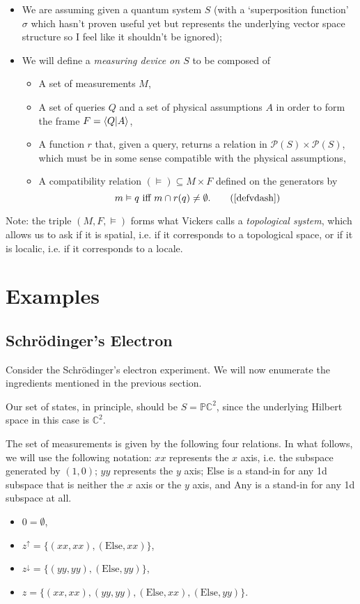 \documentclass{article}
\theoremstyle{definition}
\theoremstyle{plain}
\newcommand{\C}{\mathbb{C}}
\newcommand{\ps}{\mathcal{P}}
\newcommand{\pr}{\mathbb{P}}
\begin{document}
\begin{itemize}
\item We are assuming given a quantum system $S$ (with a `superposition function' $\sigma$ which hasn't proven useful yet but represents the underlying vector space structure so I feel like it shouldn't be ignored);

\item We will define a \emph{measuring device on $S$} to be composed of
\begin{itemize}
\item A set of measurements $M$,
\item A set of queries $Q$ and a set of physical assumptions $A$ in order to form the frame $F = \braket{Q|A}$,
\item A function $r$ that, given a query, returns a relation in $\ps(S) \times \ps(S)$, which must be in some sense compatible with the physical assumptions,
\item A compatibility relation $(\vDash) \subseteq M \times F$ defined on the generators by
\begin{equation}
m \vDash q \text{ iff } m \cap r(q) \neq \emptyset. \tag{\ref{defvdash}}
\end{equation}
\end{itemize}
\end{itemize}

Note: the triple $(M,F,\vDash)$ forms what Vickers \cite{topologyvialogic} calls a \emph{topological system}, which allows us to ask if it is spatial, i.e. if it corresponds to a topological space, or if it is localic, i.e. if it corresponds to a locale.

\section{Examples}

\subsection{Schrödinger's Electron}

Consider the Schrödinger's electron experiment. We will now enumerate the ingredients mentioned in the previous section.

Our set of states, in principle, should be $S = \pr \C^2$, since the underlying Hilbert space in this case is $\C^2$.

The set of measurements is given by the following four relations. In what follows, we will use the following notation: $xx$ represents the $x$ axis, i.e. the subspace generated by $(1,0)$; $yy$ represents the $y$ axis; $\text{Else}$ is a stand-in for any 1d subspace that is neither the $x$ axis or the $y$ axis, and $\text{Any}$ is a stand-in for any 1d subspace at all.
\begin{itemize}
\item $0 = \emptyset$,
\item $z^\uparrow = \{(xx,xx), (\text{Else}, xx)\}$,
\item $z^\downarrow = \{(yy,yy), (\text{Else},yy)\}$,
\item $z = \{(xx,xx), (yy, yy), (\text{Else}, xx), (\text{Else}, yy)\}$.
\end{itemize}
\end{document}
